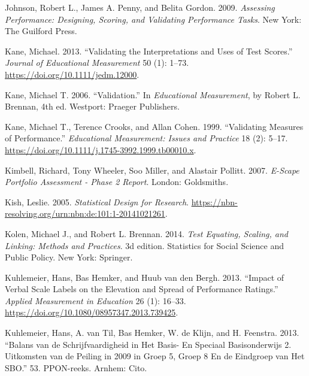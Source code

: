 \documentclass[
  letterpaper,
]{report}
\newlength{\cslhangindent}
\newlength{\cslentryspacingunit} %
\newenvironment{CSLReferences}[2] %
 {%
  \setlength{\parindent}{0pt}
  \ifodd #1
  \let\oldpar\par
  \def\par{\hangindent=\cslhangindent\oldpar}
  \fi
  \setlength{\parskip}{#2\cslentryspacingunit}
 }%
 {}
\begin{document}
\begin{CSLReferences}{1}{0}
\leavevmode{}%
Johnson, Robert L., James A. Penny, and Belita Gordon. 2009.
\emph{Assessing Performance: Designing, Scoring, and Validating
Performance Tasks}. {New York}: {The Guilford Press}.

\leavevmode{}%
Kane, Michael. 2013. {``Validating the {Interpretations} and {Uses} of
{Test Scores}.''} \emph{Journal of Educational Measurement} 50 (1):
1--73. \url{https://doi.org/10.1111/jedm.12000}.

\leavevmode{}%
Kane, Michael T. 2006. {``Validation.''} In \emph{Educational
{Measurement}}, by Robert L. Brennan, 4th ed. {Westport}: {Praeger
Publishers}.

\leavevmode{}%
Kane, Michael T., Terence Crooks, and Allan Cohen. 1999. {``Validating
{Measures} of {Performance}.''} \emph{Educational Measurement: Issues
and Practice} 18 (2): 5--17.
\url{https://doi.org/10.1111/j.1745-3992.1999.tb00010.x}.

\leavevmode{}%
Kimbell, Richard, Tony Wheeler, Soo Miller, and Alastair Pollitt. 2007.
\emph{E-Scape Portfolio Assessment - Phase 2 Report}. {London}:
{Goldsmiths}.

\leavevmode{}%
Kish, Leslie. 2005. \emph{Statistical {Design} for {Research}}.
\url{https://nbn-resolving.org/urn:nbn:de:101:1-20141021261}.

\leavevmode{}%
Kolen, Michael J., and Robert L. Brennan. 2014. \emph{Test Equating,
Scaling, and Linking: Methods and Practices}. 3d edition. Statistics for
Social Science and Public Policy. {New York}: {Springer}.

\leavevmode{}%
Kuhlemeier, Hans, Bas Hemker, and Huub van den Bergh. 2013. {``Impact of
{Verbal Scale Labels} on the {Elevation} and {Spread} of {Performance
Ratings}.''} \emph{Applied Measurement in Education} 26 (1): 16--33.
\url{https://doi.org/10.1080/08957347.2013.739425}.

\leavevmode{}%
Kuhlemeier, Hans, A. van Til, Bas Hemker, W. de Klijn, and H. Feenstra.
2013. {``Balans van de Schrijfvaardigheid in Het Basis- En Speciaal
Basisonderwijs 2. {Uitkomsten} van de Peiling in 2009 in Groep 5, Groep
8 En de Eindgroep van Het {SBO}.''} 53. {PPON-reeks}. {Arnhem}: {Cito}.


\end{CSLReferences}
\end{document}

